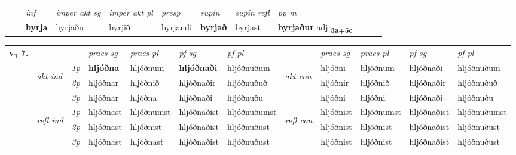 \begin{tabular}{llllllllllll}
 & & \textit{inf} & \textit{imper akt sg} & \textit{imper akt pl}   & \textit{presp} & \textit{supin} & \textit{supin refl} & \textit{pp m}     \\*
  & & \textbf{byrja} & byrjaðu  & byrjið   & byrjandi &  \textbf{byrjað} & byrjast & \textbf{byrjaður} adj \textbf{\textsubscript{3a+5c}} \\*
\cmidrule{1-12}
\end{tabular}



\begin{tabular}{llllllllllll} \toprule
\multirow{4}{*}{{{\textbf{v{\textsubscript{1}}} \Large{\textbf{7.}}}}}  & &   &  \textit{praes sg}  & \textit{praes pl}  &\textit{ pf sg} & \textit{pf pl} &  &  \textit{praes sg}  & \textit{praes pl}  & \textit{pf sg} & \textit{pf pl } \\*
	\cmidrule{4-7} \cmidrule{9-12}
 & \multirow{3}{*}{\begin{turn}{90}\textit{akt ind}\end{turn}} & {\textit{1p}} & \textbf{hljóðna} & hljóðnum    & \textbf{hljóðnaði} & hljóðnuðum & \multirow{3}{*}{\begin{turn}{90}\textit{akt con}\end{turn}} &hljóðni & hljóðnum & hljóðnaði & hljóðnuðum\\*
& &  {\textit{2p}} &  hljóðnar  & hljóðnið   & hljóðnaðir & hljóðnuðuð & & hljóðnir & hljóðnið & hljóðnaðir & hljóðnuðuð \\*
& &  {\textit{3p}} & hljóðnar & hljóðna   & hljóðnaði & hljóðnuðu & & hljóðni & hljóðni& hljóðnaði & hljóðnuðu  \\*
\cmidrule{4-7} \cmidrule{9-12}
 &\multirow{3}{*}{\begin{turn}{90}\textit{refl ind}\end{turn}} & {\textit{1p}} & hljóðnast & hljóðnumst    & hljóðnaðist & hljóðnuðumst & \multirow{3}{*}{\begin{turn}{90}\textit{refl con}\end{turn}}  &hljóðnist & hljóðnumst & hljóðnaðist & hljóðnuðumst\\*
 &&  {\textit{2p}} &  hljóðnast  & hljóðnist   & hljóðnaðist & hljóðnuðust & &hljóðnist & hljóðnist & hljóðnaðist & hljóðnuðust \\*
& &  {\textit{3p}} & hljóðnast & hljóðnast   & hljóðnaðist & hljóðnuðust & & hljóðnist & hljóðnist& hljóðnaðist & hljóðnuðust  \\*
\cmidrule{4-7} \cmidrule{9-12}
\end{tabular}


